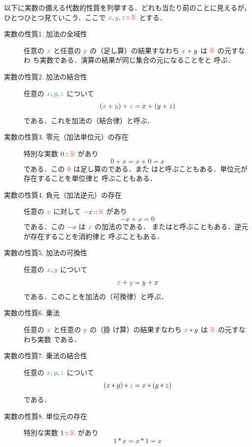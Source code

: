 \documentclass[a5paper,twoside,fleqn,draft]{jsbook}
\begin{document}
以下に実数の備える代数的性質を列挙する．どれも当たり前のことに見えるが，
ひとつひとつ見ていこう．ここで $\hVar{x},\hVar{y},\hVar{z}\hIsTypeOf\mRSet$ とする．
\begin{description}
\item[実数の性質1. 加法の全域性] 任意の $\hVar{x}$ と任意の $\hVar{y}$ の（足し算）の結果すなわち $\hVar{x}+y$ は $\mRSet$ の元すなわ
ち実数である．演算の結果が同じ集合の元になることをと
呼ぶ．
\item[実数の性質2. 加法の結合性] 任意の $\hVar{x},\hVar{y},\hVar{z}$ について
\begin{equation}
(\hVar{x}+\hVar{y})+\hVar{z}=x+(y+z)
\end{equation}
である．これを加法の（結合律）と呼ぶ．
\item[実数の性質3. 零元（加法単位元）の存在] 特別な実数 $0\hIsTypeOf\mRSet$ があり
\begin{equation}
0+x=x+0=x
\end{equation}
である．この $\hConstant{0}$ は足し算のである．また
はと呼ぶこともある．単位元が存在することを単位律と
呼ぶこともある．
\item[実数の性質4. 負元（加法逆元）の存在] 任意の $\hVar{x}$ に対して
$-x\hIsTypeOf\mRSet$ があり
\begin{equation}
-x+x=0
\end{equation}
である．この $-x$ は $\hVar{x}$ の加法のである．
またはと呼ぶこともある．逆元が存在することを消約律と
呼ぶこともある．
\item[実数の性質5. 加法の可換性] 任意の $\hVar{x},\hVar{y}$ について
\begin{equation}
\hVar{x}+\hVar{y}=y+x
\end{equation}
である．このことを加法の（可換律）と呼ぶ．
\item[実数の性質6. 乗法] 任意の $\hVar{x}$ と任意の $\hVar{y}$ の（掛
け算）の結果すなわち $\hVar{x}*y$ は $\mRSet$ の元すなわち実数
である．
\item[実数の性質7. 乗法の結合性] 任意の $\hVar{x},\hVar{y},\hVar{z}$ について
\begin{equation}
(x*y)*\hVar{z}=x*(y*z)
\end{equation}
である．
\item[実数の性質8. 単位元の存在] 特別な実数 $1\hIsTypeOf\mRSet$ があり
\begin{equation}
1*x=x*1=x

\end{equation}
\end{description}
\end{document}
